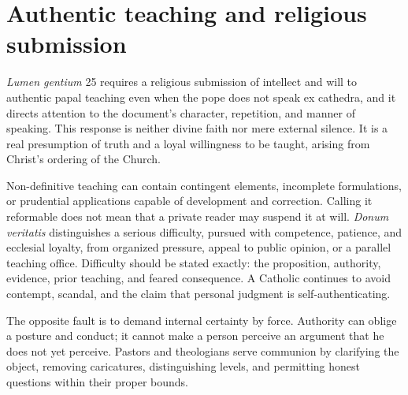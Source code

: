 \section{Authentic teaching and religious submission}

\emph{Lumen gentium} 25 requires a religious submission of intellect and will
to authentic papal teaching even when the pope does not speak ex cathedra, and
it directs attention to the document's character, repetition, and manner of
speaking. This response is neither divine faith nor mere external silence. It
is a real presumption of truth and a loyal willingness to be taught, arising
from Christ's ordering of the Church.

Non-definitive teaching can contain contingent elements, incomplete
formulations, or prudential applications capable of development and correction.
Calling it reformable does not mean that a private reader may suspend it at
will. \emph{Donum veritatis} distinguishes a serious difficulty, pursued with
competence, patience, and ecclesial loyalty, from organized pressure, appeal to
public opinion, or a parallel teaching office. Difficulty should be stated
exactly: the proposition, authority, evidence, prior teaching, and feared
consequence. A Catholic continues to avoid contempt, scandal, and the claim
that personal judgment is self-authenticating.

The opposite fault is to demand internal certainty by force. Authority can
oblige a posture and conduct; it cannot make a person perceive an argument that
he does not yet perceive. Pastors and theologians serve communion by clarifying
the object, removing caricatures, distinguishing levels, and permitting honest
questions within their proper bounds.

